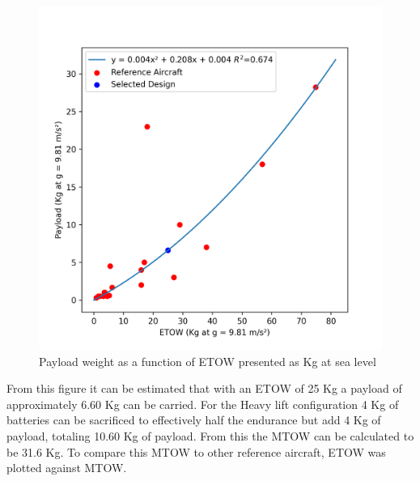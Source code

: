 \documentclass[12pt]{article}
\begin{document}
	\begin{figure}[h!]
	\centering
		\includegraphics[width=6 in]{Figures/ETOW_vs_Payload.png} %
		\caption{Payload weight as a function of ETOW presented as Kg at sea level}
		\label{fig:PayloadETOW}
	\end{figure}
	\newpage
	From this figure it can be estimated that with an ETOW of 25 Kg a payload of approximately 6.60 Kg can be carried. For the Heavy lift configuration 4 Kg of batteries can be sacrificed to effectively half the endurance but add 4 Kg of payload, totaling 10.60 Kg of payload.  From this the MTOW can be calculated to be 31.6 Kg. To compare this MTOW to other reference aircraft, ETOW was plotted against MTOW. 
	
\end{document}
